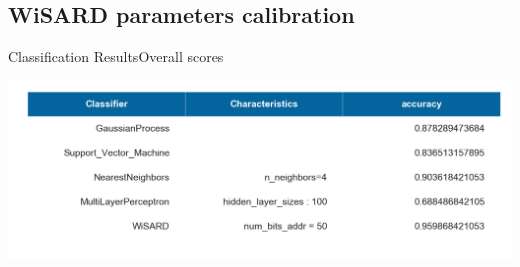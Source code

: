 \documentclass[10pt]{beamer}
\begin{document}
\subsection{WiSARD parameters calibration}
\begin{frame}{Classification Results}{Overall scores}

\centering
\includegraphics[scale=0.40]{../figures_trabalho_final/overall_results.png}

\end{frame}

{\1
\begin{frame}
\end{frame}}
\end{document}
